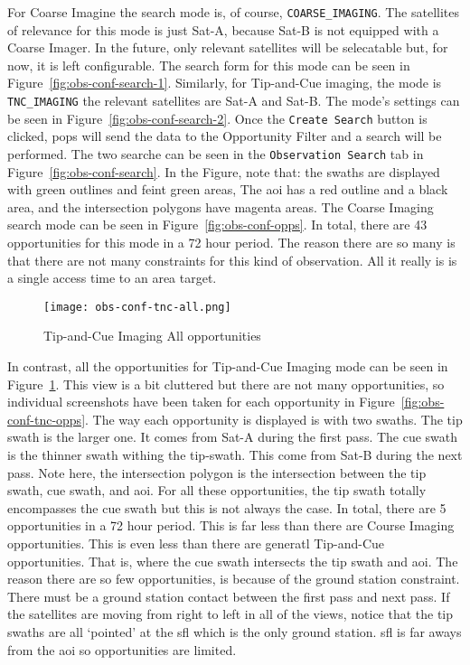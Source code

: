 For Coarse Imagine the search mode is, of course, \texttt{COARSE\_IMAGING}.
The satellites of relevance for this mode is just Sat-A, because Sat-B is not
equipped with a Coarse Imager. In the future, only relevant satellites will be
selecatable but, for now, it is left configurable.  The search form for this
mode can be seen in Figure~\ref{fig:obs-conf-search-1}. Similarly, for
Tip-and-Cue imaging, the mode is \texttt{TNC\_IMAGING} the relevant satellites
are Sat-A and Sat-B.  The mode's settings can be seen in
Figure~\ref{fig:obs-conf-search-2}. Once the \texttt{Create Search} button is
clicked, \gls{pops} will send the data to the Opportunity Filter and a search
will be performed. The two searche can be seen in the \texttt{Observation
Search} tab in Figure~\ref{fig:obs-conf-search}. In the Figure, note that: the
swaths are displayed with green outlines and feint green areas, The \gls{aoi}
has a red outline and a black area, and the intersection polygons have magenta
areas. The Coarse Imaging search mode can be seen in
Figure~\ref{fig:obs-conf-opps}. In total, there are 43 opportunities for this
mode in a 72 hour period. The reason there are so many is that there are not
many constraints for this kind of observation. All it really is is a single
access time to an area target. 

\begin{figure}[h]
    \centering
    \texttt{[image: obs-conf-tnc-all.png]} 
    \caption{Tip-and-Cue Imaging All opportunities}
    \label{fig:obs-conf-tnc-all} 
\end{figure}

In contrast, all the opportunities for Tip-and-Cue Imaging mode can be seen in
Figure~\ref{fig:obs-conf-tnc-all}. This view is a bit cluttered but there are
not many opportunities, so individual screenshots have been taken for each
opportunity in Figure~\ref{fig:obs-conf-tnc-opps}. The way each opportunity is
displayed is with two swaths.  The tip swath is the larger one. It comes from
Sat-A during the first pass. The cue swath is the thinner swath withing the
tip-swath. This come from Sat-B during the next pass. Note here, the
intersection polygon is the intersection between the tip swath, cue swath, and
\gls{aoi}. For all these opportunities, the tip swath totally encompasses the
cue swath but this is not always the case. In total, there are 5 opportunities
in a 72 hour period. This is far less than there are Course Imaging
opportunities. This is even less than there are generatl Tip-and-Cue
opportunities. That is, where the cue swath intersects the tip swath and
\gls{aoi}. The reason there are so few opportunities, is because of the ground
station constraint. There must be a ground station contact between the first
pass and next pass. If the satellites are moving from right to left in all of
the views, notice that the tip swaths are all `pointed' at the \gls{sfl} which
is the only ground station. \gls{sfl} is far aways from the \gls{aoi} so
opportunities are limited. 


